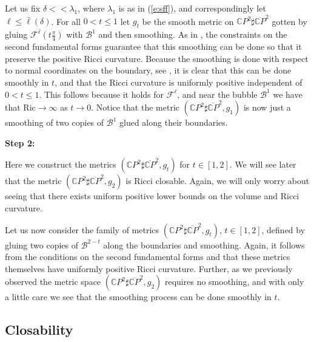 \documentclass[11pt]{article}
\newcommand{\Ric}{\text{Ric}}
\newcommand{\CC}{\mathds{C}}
\newcommand{\cF}{\mathcal{F}}
\newcommand{\cB}{\mathcal{B}}
\begin{document}
Let us fix $\delta<<\lambda_{1}$, where $\lambda_1$ is as in (\ref{e:sff}), and correspondingly let $\ell\leq \bar\ell(\delta)$.  For all $0< t\leq 1$ let $g_t$ be the smooth metric on $\mathds{C}P^2\sharp \overline{\mathds{C}P}^2$ gotten by gluing $\cF^{\bar\ell}(t \frac{\pi}{4})$ with $\cB^1$ and then smoothing.  As in \cite{P1}, the constraints on the second fundamental forms guarantee that this smoothing can be done so that it preserve the positive Ricci curvature.  Because the smoothing is done with respect to normal coordinates on the boundary, see \cite{P1}, it is clear that this can be done smoothly in $t$, and that the Ricci curvature is uniformly positive independent of $0<t\leq 1$.  This follows because it holds for $\cF^{\ell}$, and near the bubble $\cB^1$ we have that $\Ric\to \infty$ as $t\to 0$.  Notice that the metric $(\mathds{C}P^2\sharp \overline{\mathds{C}P}^2,g_1)$ is now just a smoothing of two copies of $\cB^1$ glued along their boundaries.

\vskip3mm
{\bf Step 2:}
\vskip3mm

Here we construct the metrics $(\CC P^2\sharp\overline{\CC P}^2,g_t)$ for $t\in [1,2]$.  We will see later that the metric $(\CC P^2\sharp\overline{\CC P}^2,g_2)$ is Ricci closable.  Again, we will only worry about seeing that there exists uniform positive lower bounds on the volume and Ricci curvature.

Let us now consider the family of metrics $(\CC P^2\sharp\overline{\CC P}^2,g_t)$, $t\in [1,2]$, defined by gluing two copies of $\cB^{2-t}$ along the boundaries and smoothing.  Again, it follows from the conditions on the second fundamental forms and \cite{P1} that these metrics themselves have uniformly positive Ricci curvature.  Further, as we previously observed the metric space $(\CC P^2\sharp\overline{\CC P}^2,g_2)$ requires no smoothing, and with only a little care we see that the smoothing process can be done smoothly in $t$.

\subsection{Closability} 
\end{document}
